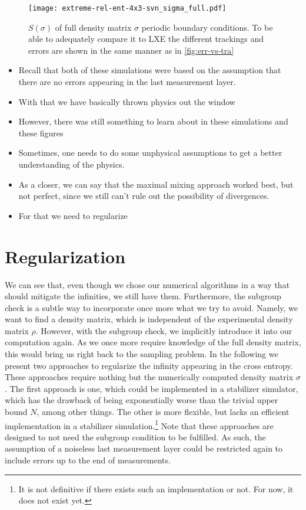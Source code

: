\begin{figure}[p]
  \centering
  \texttt{[image: extreme-rel-ent-4x3-svn\_sigma\_full.pdf]}
  \caption{$S(\sigma)$ of full density matrix $\sigma$ 
  periodic boundary conditions. To be able to adequately compare it to LXE the
different trackings and errors are shown in the same manner as in
\cref{fig:err-vs-tra}}
  \label{fig:max_mix-svn_sigma_full-4x3}
\end{figure}

\begin{itemize}
  \item Recall that both of these simulations were based on the assumption that
    there are no errors appearing in the last measurement layer.
  \item With that we have basically thrown physics out the window
  \item However, there was still something to learn about in these simulations
    and these figures
  \item Sometimes, one needs to do some unphysical assumptions to get a better
    understanding of the physics.
  \item As a closer, we can say that the maximal mixing approach worked best,
    but not perfect, since we still can't rule out the possibility of
    divergences.
  \item For that we need to regularize
\end{itemize}
\section{Regularization}

We can see that, even though we chose our numerical algorithms in a way that
should mitigate the infinities, we still have them. Furthermore, the subgroup
check is a subtle way to incorporate once more what we try to avoid. Namely, we
want to find a density matrix, which is independent of the experimental density
matrix $\rho$. However, with the subgroup check, we implicitly introduce it
into our computation again. As we once more require knowledge of the full
density matrix, this would bring us right back to the sampling problem. In the
following we present two approaches to regularize the infinity appearing in the
cross entropy. These approaches require nothing but the numerically computed
density matrix $\sigma$. The first approach is one, which could be implemented
in a stabilizer simulator, which has the drawback of being exponentially worse
than the trivial upper bound $N$, among other things. The other is more
flexible, but lacks an efficient implementation in a stabilizer
simulation.\footnote{It is not definitive if there exists such an
implementation or not. For now, it does not exist yet.}
Note that these approaches are
designed to not need the subgroup condition to be fulfilled. As such, the
assumption of a noiseless last measurement layer could be restricted again to
include errors up to the end of measurements. 

